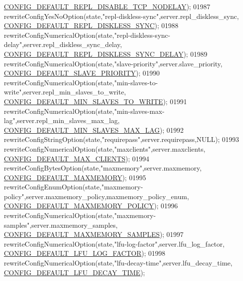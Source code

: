 \begin{DoxyCode}
{{{{{{{{{{{{{{{{{{{{{{{{{{{{      \hyperlink{server_8h_a27f51044a8a11ab99366a77bb3ea1e93}{CONFIG\_DEFAULT\_REPL\_DISABLE\_TCP\_NODELAY});
01987     rewriteConfigYesNoOption(state,\textcolor{stringliteral}{"repl-diskless-sync"},server.repl\_diskless\_sync,
      \hyperlink{server_8h_a08ebaf972da18ad58c71c615aa26c5cf}{CONFIG\_DEFAULT\_REPL\_DISKLESS\_SYNC});
01988     rewriteConfigNumericalOption(state,\textcolor{stringliteral}{"repl-diskless-sync-delay"},server.repl\_diskless\_sync\_delay,
      \hyperlink{server_8h_aee54cf0e2819c8b96136987f0f8ef0b8}{CONFIG\_DEFAULT\_REPL\_DISKLESS\_SYNC\_DELAY});
01989     rewriteConfigNumericalOption(state,\textcolor{stringliteral}{"slave-priority"},server.slave\_priority,
      \hyperlink{server_8h_a7effaf912f26a1eabe495e899d705fee}{CONFIG\_DEFAULT\_SLAVE\_PRIORITY});
01990     rewriteConfigNumericalOption(state,\textcolor{stringliteral}{"min-slaves-to-write"},server.repl\_min\_slaves\_to\_write,
      \hyperlink{server_8h_a68661cd596afb7595059264beee63dc7}{CONFIG\_DEFAULT\_MIN\_SLAVES\_TO\_WRITE});
01991     rewriteConfigNumericalOption(state,\textcolor{stringliteral}{"min-slaves-max-lag"},server.repl\_min\_slaves\_max\_lag,
      \hyperlink{server_8h_a547664770d2cec2d58d144a2f5afbbd8}{CONFIG\_DEFAULT\_MIN\_SLAVES\_MAX\_LAG});
01992     rewriteConfigStringOption(state,\textcolor{stringliteral}{"requirepass"},server.requirepass,NULL);
01993     rewriteConfigNumericalOption(state,\textcolor{stringliteral}{"maxclients"},server.maxclients,
      \hyperlink{server_8h_ab24065d7a9205264189681ab4e4d410e}{CONFIG\_DEFAULT\_MAX\_CLIENTS});
01994     rewriteConfigBytesOption(state,\textcolor{stringliteral}{"maxmemory"},server.maxmemory,
      \hyperlink{server_8h_a314eacfa28e22254ee8cc05f2b257281}{CONFIG\_DEFAULT\_MAXMEMORY});
01995     rewriteConfigEnumOption(state,\textcolor{stringliteral}{"maxmemory-policy"},server.maxmemory\_policy,maxmemory\_policy\_enum,
      \hyperlink{server_8h_a5b8590d1c7aa090e48b9506c0842d206}{CONFIG\_DEFAULT\_MAXMEMORY\_POLICY});
01996     rewriteConfigNumericalOption(state,\textcolor{stringliteral}{"maxmemory-samples"},server.maxmemory\_samples,
      \hyperlink{server_8h_a38e65004c240be8a04ab492731c7da50}{CONFIG\_DEFAULT\_MAXMEMORY\_SAMPLES});
01997     rewriteConfigNumericalOption(state,\textcolor{stringliteral}{"lfu-log-factor"},server.lfu\_log\_factor,
      \hyperlink{server_8h_ab343786c44a1885885a1ac254b724317}{CONFIG\_DEFAULT\_LFU\_LOG\_FACTOR});
01998     rewriteConfigNumericalOption(state,\textcolor{stringliteral}{"lfu-decay-time"},server.lfu\_decay\_time,
      \hyperlink{server_8h_a24a132a96a693133fc057a491080aebf}{CONFIG\_DEFAULT\_LFU\_DECAY\_TIME});
}}}}}}}}}}}}}}}}}}}}}}}}}}}}
\end{DoxyCode}
